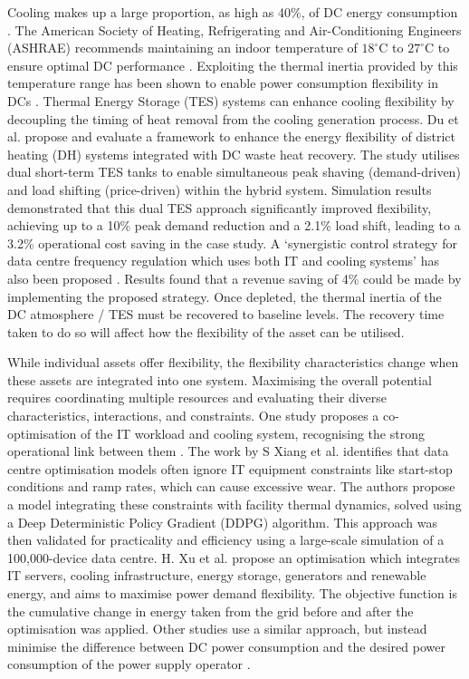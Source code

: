 \documentclass[lettersize,journal]{IEEEtran}
\begin{document}
Cooling makes up a large proportion, as high as 40\%, of DC energy consumption \cite{zhao2021synthetic}.  The American Society of Heating, Refrigerating and Air-Conditioning Engineers (ASHRAE) recommends maintaining an indoor temperature of $18^\circ\mathrm{C}$ to $27^\circ\mathrm{C}$ to ensure optimal DC performance \cite{tc2016data}. Exploiting the thermal inertia provided by this temperature range has been shown to enable power consumption flexibility in DCs \cite{takci2025data}\cite{ref22}. Thermal Energy Storage (TES) systems can enhance cooling flexibility by decoupling the timing of heat removal from the cooling generation process.
Du et al. \cite{du2025new} propose and evaluate a framework to enhance the energy flexibility of district heating (DH) systems integrated with DC waste heat recovery. The study utilises dual short-term TES tanks to enable simultaneous peak shaving (demand-driven) and load shifting (price-driven) within the hybrid system. Simulation results demonstrated that this dual TES approach significantly improved flexibility, achieving up to a 10\% peak demand reduction and a 2.1\% load shift, leading to a 3.2\% operational cost saving in the case study. A `synergistic control strategy for data centre frequency regulation which uses both IT and cooling systems' has also been proposed \cite{Fu2020ApEn}. Results found that a revenue saving of 4\% could be made by implementing the proposed strategy. Once depleted, the thermal inertia of the DC atmosphere / TES must be recovered to baseline levels. The recovery time taken to do so will affect how the flexibility of the asset can be utilised.


While individual assets offer flexibility, the flexibility characteristics change when these assets are integrated into one system. Maximising the overall potential requires coordinating multiple resources and evaluating their diverse characteristics, interactions, and constraints. One study proposes a co-optimisation of the IT workload and cooling system, recognising the strong operational link between them \cite{Fu2020ApEn}. The work by S Xiang et al. \cite{xiang2023modeling} identifies that data centre optimisation models often ignore IT equipment constraints like start-stop conditions and ramp rates, which can cause excessive wear. The authors propose a model integrating these constraints with facility thermal dynamics, solved using a Deep Deterministic Policy Gradient (DDPG) algorithm. This approach was then validated for practicality and efficiency using a large-scale simulation of a 100,000-device data centre.
H. Xu et al. \cite{Xu2023SPIE} propose an optimisation which integrates IT servers, cooling infrastructure, energy storage, generators and renewable energy, and aims to maximise power demand flexibility. The objective function is the cumulative change in energy taken from the grid before and after the optimisation was applied. 
Other studies use a similar approach, but instead minimise the difference between DC power consumption and the desired power consumption of the power supply operator \cite{cioara2018optimized}. 
\end{document}

